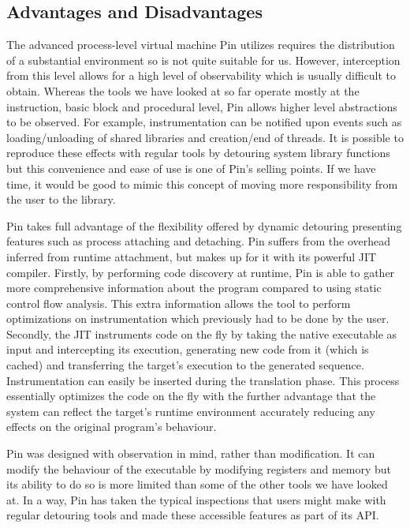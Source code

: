 \subsection{Advantages and Disadvantages}

The advanced process-level virtual machine Pin utilizes requires the distribution of a substantial environment so is not quite suitable for us. However, interception from this level allows for a high level of observability which is usually difficult to obtain. Whereas the tools we have looked at so far operate mostly at the instruction, basic block and procedural level, Pin allows higher level abstractions to be observed. For example, instrumentation can be notified upon events such as loading/unloading of shared libraries and creation/end of threads. It is possible to reproduce these effects with regular tools by detouring system library functions but this convenience and ease of use is one of Pin's selling points. If we have time, it would be good to mimic this concept of moving more responsibility from the user to the library.

Pin takes full advantage of the flexibility offered by dynamic detouring presenting features such as process attaching and detaching. Pin suffers from the overhead inferred from runtime attachment, but makes up for it with its powerful JIT compiler. Firstly, by performing code discovery at runtime, Pin is able to gather more comprehensive information about the program compared to using static control flow analysis. This extra information allows the tool to perform optimizations on instrumentation which previously had to be done by the user. Secondly, the JIT instruments code on the fly by taking the native executable as input and intercepting its execution, generating new code from it (which is cached) and transferring the target's execution to the generated sequence. Instrumentation can easily be inserted during the translation phase. This process essentially optimizes the code on the fly with the further advantage that the system can reflect the target's runtime environment accurately reducing any effects on the original program's behaviour.

Pin was designed with observation in mind, rather than modification. It can modify the behaviour of the executable by modifying registers and memory but its ability to do so is more limited than some of the other tools we have looked at. In a way, Pin has taken the typical inspections that users might make with regular detouring tools and made these accessible features as part of its API.

